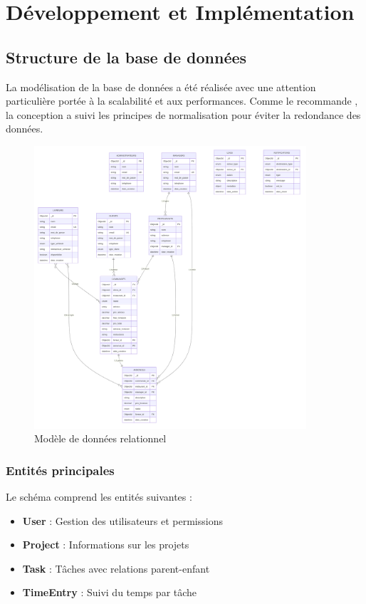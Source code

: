 \chapter{Développement et Implémentation}

\section{Structure de la base de données}
La modélisation de la base de données a été réalisée avec une attention particulière portée à la scalabilité et aux performances. Comme le recommande \cite{martin2017clean}, la conception a suivi les principes de normalisation pour éviter la redondance des données.

\begin{figure}[H]
	\centering
	\includegraphics[width=0.9\textwidth]{images/modele-donnees.png}
	\caption{Modèle de données relationnel}
	\label{fig:modele-donnees}
\end{figure}

\subsection{Entités principales}
Le schéma comprend les entités suivantes :
\begin{itemize}
	\item \textbf{User} : Gestion des utilisateurs et permissions
	\item \textbf{Project} : Informations sur les projets
	\item \textbf{Task} : Tâches avec relations parent-enfant
	\item \textbf{TimeEntry} : Suivi du temps par tâche
\end{itemize}

